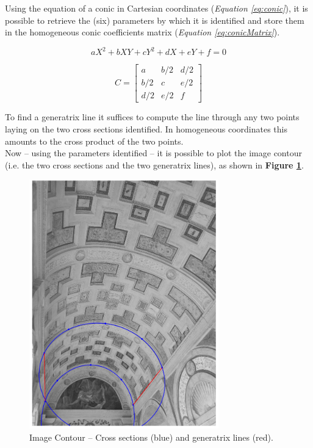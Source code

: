 \documentclass[12pt,a4paper]{article}
\begin{document}
Using the equation of a conic in Cartesian coordinates (\textit{Equation \ref{eq:conic}}), it is possible to retrieve the (six) parameters by which it is identified and store them in the homogeneous conic coefficients matrix (\textit{Equation \ref{eq:conicMatrix}}).

\begin{equation}
    aX^2+bXY+cY^2+dX+eY+f=0
    \label{eq:conic}
\end{equation}

\begin{equation}
    C =
    \begin{bmatrix}
    a & b/2 & d/2\\
    b/2 & c & e/2\\
    d/2 & e/2 & f
    \end{bmatrix}
    \label{eq:conicMatrix}
\end{equation}
\bigskip

To find a generatrix line it suffices to compute the line through any two points laying on the two cross sections identified. In homogeneous coordinates this amounts to the cross product of the two points.\\

Now -- using the parameters identified -- it is possible to plot the image contour (i.e. the two cross sections and the two generatrix lines), as shown in \textbf{Figure \ref{fig:contour}}.

\begin{figure}[H]
    \centering
    \includegraphics[width=0.73\textwidth]{Images/PalazzoTe_contour.png}
    \caption[Image Contour -- Cross sections and generatrix lines.]{Image Contour -- Cross sections (blue) and generatrix lines (red).}
    \label{fig:contour}
\end{figure}
\end{document}
